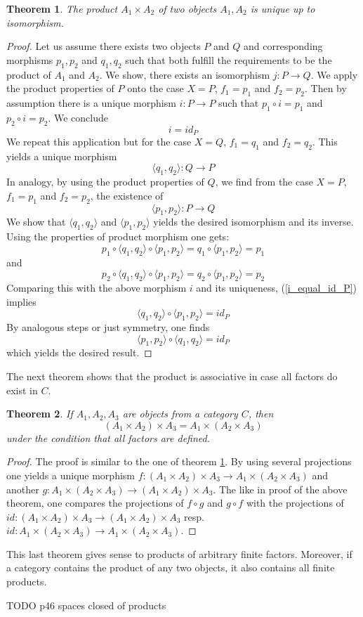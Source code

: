 \documentclass[17pt]{extarticle}
\newtheorem{theorem}{Theorem}
\begin{document}
\begin{theorem} \label{product_isomorphy}
	The product $A_1\times A_2$ of two objects $A_1, A_2$ is unique up to isomorphism.
\end{theorem}
\begin{proof}
	Let us assume there exists two objects $P$ and $Q$ and corresponding morphisms $p_1, p_2$ and $q_1, q_2$ such that both fulfill the requirements to be the product of $A_1$ and $A_2$. We show, there exists an isomorphism $j:P\rightarrow Q$. We apply the product properties of $P$ onto the case $X=P$, $f_1=p_1$ and $f_2=p_2$. Then by assumption there is a unique morphism $i:P\rightarrow P$ such that $p_1\circ i = p_1$ and $p_2\circ i = p_2$. We conclude 
	\begin{equation} \label{i_equal_id_P}
	i=id_P
    \end{equation}
    We repeat this application but for the case $X=Q$, $f_1=q_1$ and $f_2=q_2$. This yields a unique morphism 
    $$\langle q_1,q_2 \rangle:Q\rightarrow P$$
    In analogy, by using the product properties of $Q$, we find from the case $X=P$, $f_1=p_1$ and $f_2=p_2$, the existence of 
    $$\langle p_1,p_2 \rangle:P\rightarrow Q$$
    We show that $\langle q_1,q_2 \rangle$ and $\langle p_1,p_2 \rangle$ yields the desired isomorphism and its inverse. Using the properties of product morphism one gets:
    $$
    p_1\circ \langle q_1,q_2 \rangle \circ \langle p_1,p_2 \rangle = q_1\circ  \langle p_1,p_2 \rangle=p_1
    $$
    and
    $$
    p_2\circ \langle q_1,q_2 \rangle \circ \langle p_1,p_2 \rangle = q_2\circ  \langle p_1,p_2 \rangle=p_2
    $$
    Comparing this with the above morphism $i$ and its uniqueness, (\ref{i_equal_id_P}) implies
    $$
    \langle q_1,q_2 \rangle \circ \langle p_1,p_2 \rangle=id_P
    $$
    By analogous steps or just symmetry, one finds
    $$
    \langle p_1,p_2 \rangle \circ  \langle q_1,q_2 \rangle=id_P
    $$
    which yields the desired result.	 
\end{proof}
The next theorem shows that the product is associative in case all factors do exist in $C$.

\begin{theorem}
	If $A_1, A_2, A_3$ are objects from a category $C$, then
	$$(A_1\times A_2)\times A_3=A_1\times (A_2\times A_3)$$
	under the condition that all factors are defined.
\end{theorem}
\begin{proof}
	The proof is similar to the one of theorem \ref{product_isomorphy}. By using
	several projections one yields a unique morphism $f:(A_1\times A_2)\times A_3\rightarrow A_1\times (A_2\times A_3)$ and another $g:A_1\times (A_2\times A_3)\rightarrow  (A_1\times A_2)\times A_3$. The like in proof of the above theorem, one compares the projections of $f\circ g$ and $g\circ f$ with the projections of $id:(A_1\times A_2)\times A_3\rightarrow (A_1\times A_2)\times A_3$ resp. $id:A_1\times (A_2\times A_3)\rightarrow A_1\times (A_2\times A_3)$.
\end{proof}
This last theorem gives sense to products of arbitrary finite factors. Moreover, if a category contains the product of any two objects, it also contains all finite products.



TODO p46 spaces closed of products  
\end{document}
